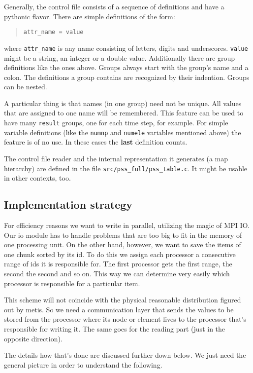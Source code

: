 Generally, the control file consists of a sequence of definitions
and have a pythonic flavor. There are simple definitions of the form: 

\begin{quote}
\texttt{attr{\_}name~=~value }
\end{quote}
where \texttt{attr{\_}name} is any name consisting of letters, digits
and underscores. \texttt{value} might be a string, an integer or a
double value. Additionally there are group definitions like the ones
above. Groups always start with the group's name and a colon. The
definitions a group contains are recognized by their indention. Groups
can be nested.

A particular thing is that names (in one group) need not be unique.
All values that are assigned to one name will be remembered. This
feature can be used to have many \texttt{result} groups, one for each
time step, for example. For simple variable definitions (like the
\texttt{numnp} and \texttt{numele} variables mentioned above) the
feature is of no use. In these cases the \textbf{last} definition
counts.

The control file reader and the internal representation it generates
(a map hierarchy) are defined in the file \texttt{src/pss{\_}full/pss{\_}table.c}.
It might be usable in other contexts, too.


\subsection{Implementation strategy}

For efficiency reasons we want to write in parallel, utilizing the
magic of MPI IO. Our io module has to handle problems that are too
big to fit in the memory of one processing unit. On the other hand,
however, we want to save the items of one chunk sorted by its id.
To do this we assign each processor a consecutive range of ids it
is responsible for. The first processor gets the first range, the
second the second and so on. This way we can determine very easily
which processor is responsible for a particular item.

This scheme will not coincide with the physical reasonable distribution
figured out by metis. So we need a communication layer that sends
the values to be stored from the processor where its node or element
lives to the processor that's responsible for writing it. The same
goes for the reading part (just in the opposite direction).

The details how that's done are discussed further down below. We just
need the general picture in order to understand the following.


